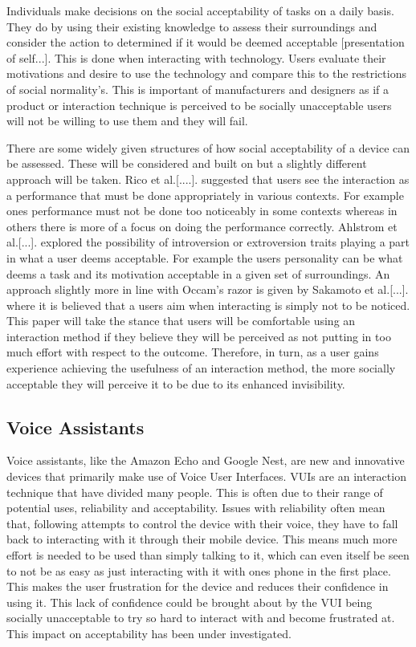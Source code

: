 \documentclass{l4proj}
\begin{document}
Individuals make decisions on the social acceptability of tasks on a daily basis. They do by using their existing knowledge to assess their surroundings and consider the action to determined if it would be deemed acceptable [presentation of self...]. This is done when interacting with technology. Users evaluate their motivations and desire to use the technology and compare this to the restrictions of social normality's. This is important of manufacturers and designers as if a product or interaction technique is perceived to be socially unacceptable users will not be willing to use them and they will fail.

There are some widely given structures of how social acceptability of a device can be assessed. These will be considered and built on but a slightly different approach will be taken. Rico et al.[....]. suggested that users see the interaction as a performance that must be done appropriately in various contexts. For example ones performance must not be done too noticeably in some contexts whereas in others there is more of a focus on doing the performance correctly. Ahlstrom et al.[...]. explored the possibility of introversion or extroversion traits playing a part in what a user deems acceptable. For example the users personality can be what deems a task and its motivation acceptable in a given set of surroundings. An approach slightly more in line with Occam's razor is given by Sakamoto et al.[...]. where it is believed that a users aim when interacting is simply not to be noticed. This paper will take the stance that users will be comfortable using an interaction method if they believe they will be perceived as not putting in too much effort with respect to the outcome. Therefore, in turn, as a user gains experience achieving the usefulness of an interaction method, the more socially acceptable they will perceive it to be due to its enhanced invisibility.

\subsection{Voice Assistants}

Voice assistants, like the Amazon Echo and Google Nest, are new and innovative devices that primarily make use of Voice User Interfaces. VUIs are an interaction technique that have divided many people. This is often due to their range of potential uses, reliability and acceptability. Issues with reliability often mean that, following attempts to control the device with their voice, they have to fall back to interacting with it through their mobile device. This means much more effort is needed to be used than simply talking to it, which can even itself be seen to not be as easy as just interacting with it with ones phone in the first place. This makes the user frustration for the device and reduces their confidence in using it. This lack of confidence could be brought about by the VUI being socially unacceptable to try so hard to interact with and become frustrated at. This impact on acceptability has been under investigated.
\end{document}
